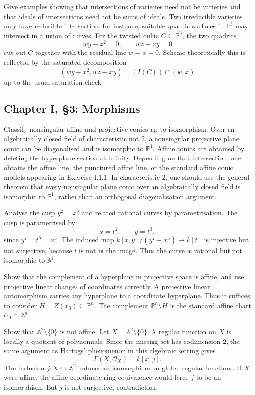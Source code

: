 \documentclass[12pt]{article}
\theoremstyle{plain}
\theoremstyle{definition}
\newcommand{\bb}[1]{\mathbb{#1}}
\begin{document}
\questionpar Give examples showing that intersections of varieties need not be varieties and that ideals of intersections need not be sums of ideals.
\solutionpar Two irreducible varieties may have reducible intersection: for instance, suitable quadric surfaces in $\bb P^3$ may intersect in a union of curves. For the twisted cubic $C\subseteq\bb P^3$, the two quadrics
\[
wy-x^2=0,
\qquad wz-xy=0
\]
cut out $C$ together with the residual line $w=x=0$. Scheme-theoretically this is reflected by the saturated decomposition
\[
(wy-x^2,wz-xy)=(I(C))\cap(w,x)
\]
up to the usual saturation check.

\subsection{Chapter I, \S 3: Morphisms}

\questionpar Classify nonsingular affine and projective conics up to isomorphism.
\solutionpar Over an algebraically closed field of characteristic not $2$, a nonsingular projective plane conic can be diagonalised and is isomorphic to $\bb P^1$. Affine conics are obtained by deleting the hyperplane section at infinity. Depending on that intersection, one obtains the affine line, the punctured affine line, or the standard affine conic models appearing in Exercise I.1.1. In characteristic $2$, one should use the general theorem that every nonsingular plane conic over an algebraically closed field is isomorphic to $\bb P^1$, rather than an orthogonal diagonalisation argument.

\questionpar Analyse the cusp $y^2=x^3$ and related rational curves by parametrisation.
\solutionpar The cusp is parametrised by
\[
x=t^2,
\qquad y=t^3,
\]
since $y^2=t^6=x^3$. The induced map $k[x,y]/(y^2-x^3)\to k[t]$ is injective but not surjective, because $t$ is not in the image. Thus the curve is rational but not isomorphic to $\bb A^1$.

\questionpar Show that the complement of a hyperplane in projective space is affine, and use projective linear changes of coordinates correctly.
\solutionpar A projective linear automorphism carries any hyperplane to a coordinate hyperplane. Thus it suffices to consider $H=Z(x_0)\subseteq\bb P^n$. The complement $\bb P^n\setminus H$ is the standard affine chart $U_0\cong\bb A^n$.

\questionpar Show that $\bb A^2\setminus\{0\}$ is not affine.
\solutionpar Let $X=\bb A^2\setminus\{0\}$. A regular function on $X$ is locally a quotient of polynomials. Since the missing set has codimension $2$, the same argument as Hartogs' phenomenon in this algebraic setting gives
\[
\Gamma(X,\mathcal O_X)=k[x,y].
\]
The inclusion $j:X\hookrightarrow\bb A^2$ induces an isomorphism on global regular functions. If $X$ were affine, the affine coordinate-ring equivalence would force $j$ to be an isomorphism. But $j$ is not surjective, contradiction.
\end{document}
